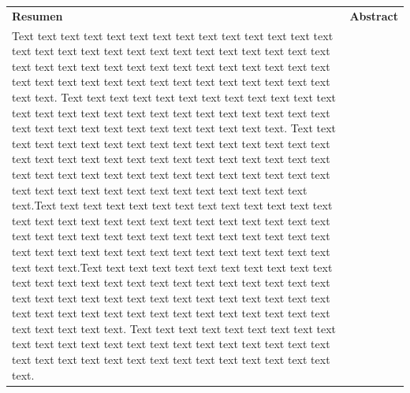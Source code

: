 \documentclass[12pt,twoside]{apa7}
\begin{document}
\vspace{-1cm}
\begin{table}[htb]
\begin{tabular}{p{8.5cm}p{8.5cm}}
{\normalsize \bfseries Resumen} &{\normalsize \bfseries Abstract} \\[0.3cm]
\small Text text text text text text text text text text text text text text text text text text text text text text text text text text text text text text text text text text text text text text text text text text text text text text text text text text text text text text text text text text. Text text text text text text text text text text text text text text text text text text text text text text text text text text text text text text text text text text text text text text. Text text text text text text text text text text text text text text text text text text text text text text text text text text text text text text text text text text text text text text text text text text text text text text text text text text text text text text text text text text.Text text text text text text text text text text text text text text text text text text text text text text text text text text text text text text text text text text text text text text text text text text text text text text text text text text text text text text text text text text.Text text text text text text text text text text text text text text text text text text text text text text text text text text text text text text text text text text text text text text text text text text text text text text text text text text text text text text text text text text. Text text text text text text text text text text text text text text text text text text text text text text text text text text text text text text text text text text text text text text.


\end{tabular}
\end{table}
\end{document}
